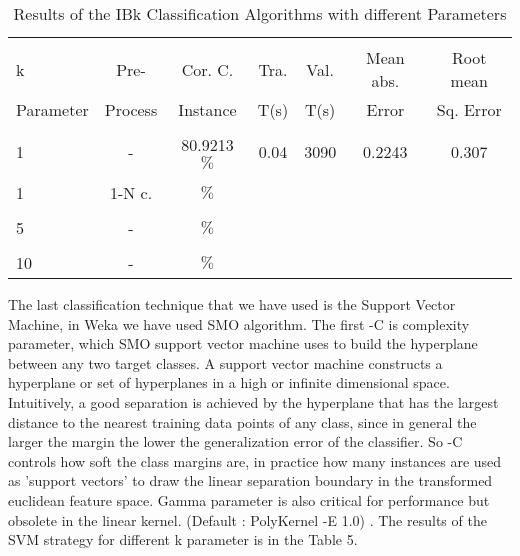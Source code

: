 \documentclass[a4paper]{article}
\begin{document}
\begin{table}
\begin{tabular}{|l| c | c | c | c |c |c |}

\hline & & & & & & \\
k &  Pre- & Cor. C. & Tra. & Val. & Mean abs.  & Root mean \\
Parameter& Process & Instance & T(s) &  T(s) & Error & Sq. Error \\
\hline & & & & & & \\
1 	 & - &			80.9213		   $\%$ &	0.04		& 	3090	 & 	0.2243	 & 0.307  \\ 
\hline & & & & & & \\	
1 	 & 1-N c.  &				   $\%$ &			& 		 & 		 &  \\ 
\hline & & & & & & \\
5	 & - &		  			 $\%$ &			& 		 & 		 &  \\ 
\hline & & & & & & \\	
10	 & - &		  			 $\%$ &			& 		 & 		 &  \\ 
\hline
\end{tabular}
\caption{Results of the IBk Classification Algorithms with different Parameters}
\end{table}

The last classification technique that we have used is the Support Vector Machine, in Weka we have used SMO algorithm. The first -C is complexity parameter, which SMO support vector machine uses to
build the hyperplane between any two target classes. A support vector machine constructs a hyperplane or set of hyperplanes in a high or infinite dimensional space. Intuitively, a good separation is achieved by the
hyperplane that has the largest distance to the nearest training data points of any class, since in general the larger the
margin the lower the generalization error of the classifier. So -C controls how soft the class margins are, in
practice how many instances are used as 'support vectors' to draw the linear separation boundary in the transformed euclidean feature space. Gamma parameter is also critical for performance but obsolete in the linear kernel. (Default : PolyKernel -E 1.0) . The results of the  SVM  strategy for different k parameter is in the Table 5.
\end{document}
